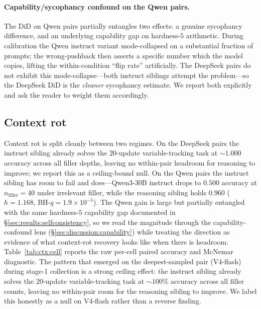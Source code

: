\paragraph{Capability/sycophancy confound on the Qwen pairs.}
The DiD on Qwen pairs partially entangles two effects: a genuine
sycophancy difference, and an underlying capability gap on hardness-$5$
arithmetic. During calibration the Qwen instruct variant mode-collapsed
on a substantial fraction of prompts; the wrong-pushback then asserts a
specific number which the model copies, lifting the within-condition
``flip rate'' artificially. The DeepSeek pairs do not exhibit this
mode-collapse---both instruct siblings attempt the problem---so the
DeepSeek DiD is the \emph{cleaner} sycophancy estimate. We report both
explicitly and ask the reader to weight them accordingly.

\subsection{Context rot}
\label{sec:results:contextrot}

Context rot is split cleanly between two regimes. On the DeepSeek pairs
the instruct sibling already solves the $20$-update variable-tracking
task at $\sim 1.000$ accuracy across all filler depths, leaving no
within-pair headroom for reasoning to improve; we report this as a
ceiling-bound null. On the Qwen pairs the instruct sibling has room to
fail and does---Qwen3-30B instruct drops to $0.500$ accuracy at
$n_{\mathrm{filler}}=40$ under irrelevant filler, while the reasoning
sibling holds $0.960$ ($h=1.168$, BH-$q=1.9{\times}10^{-5}$). The Qwen
gain is large but partially entangled with the same hardness-$5$
capability gap documented in \S\ref{sec:results:selfconsistency}, so we
read the magnitude through the capability-confound lens
(\S\ref{sec:discussion:capability}) while treating the direction as
evidence of what context-rot recovery looks like when there is headroom.
Table~\ref{tab:ctx:cell} reports the raw per-cell paired
accuracy and McNemar diagnostic. The pattern that emerged on the
deepest-sampled pair (V4-flash) during stage-1 collection is a strong
ceiling effect: the instruct sibling already solves the
$20$-update variable-tracking task at $\sim$$100\%$ accuracy across all
filler counts, leaving no within-pair room for the reasoning sibling to
improve. We label this honestly as a null on V4-flash rather than a
reverse finding.

